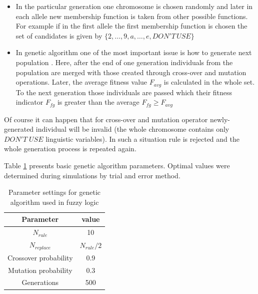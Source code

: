 \begin{itemize}
\begin{itemize}
\begin{figure}[H]
                    \label{fig:cross_over}
                \end{figure}
            \item In the particular generation one chromosome is chosen
                randomly and later in each allele new membership function is
                taken from other possible functions. For example if in the first
                allele the first membership function is chosen the set of
                candidates is given by $\{2, \ldots, 9, a, \ldots, e, DON'T\, USE\}$
            \item In genetic algorithm one of the most important issue is how
                to generate next population \cite{bib22}. Here, after the end of one
                generation individuals from the population are merged with
                those created through cross-over and mutation operations.
                Later, the average fitness value $F_{avg}$ is calculated in the whole
                set. To the next generation those individuals are passed which
                their fitness indicator $F_{fg}$ is greater than the average
                $F_{fg} \ge F_{avg}$
        \end{itemize}
\end{itemize}
Of course it can happen that for cross-over and mutation operator
newly-generated individual will be invalid (the whole chromosome contains only
$DON'T\; USE$ linguistic variables). In such a situation rule is rejected and
the whole generation process is repeated again.

Table \ref{tab:fuzzy_genetic_parameters} presents basic genetic algorithm parameters.
Optimal values were determined during simulations by trial and error method.
\begin{table}[H]
    \caption{Parameter settings for genetic algorithm used in fuzzy logic}
    \centering
    \begin{tabular}{|c|c|}
        \hline
        Parameter & value \\ \hline \hline
        $N_{rule}$ & 10 \\ \hline
        $N_{replace}$ & $N_{rule}/2$ \\ \hline
        Crossover probability & 0.9 \\ \hline
        Mutation probability & 0.3 \\ \hline
        Generations & 500 \\ \hline
    \end{tabular}
    \label{tab:fuzzy_genetic_parameters}
\end{table}
